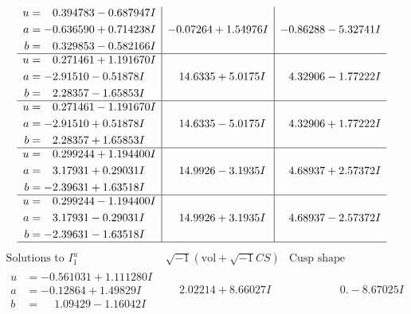 \documentclass[1p]{elsarticle_modified}
\theoremstyle{definition}
\newcommand{\I}{\sqrt{-1}}
\begin{document}
$$\begin{array}{c|c|c}
\begin{aligned}
u &= \phantom{-}0.394783 - 0.687947 I \\
a &= -0.636590 + 0.714238 I \\
b &= \phantom{-}0.329853 - 0.582166 I\end{aligned}
 & -0.07264 + 1.54976 I & -0.86288 - 5.32741 I \\ \hline\begin{aligned}
u &= \phantom{-}0.271461 + 1.191670 I \\
a &= -2.91510 - 0.51878 I \\
b &= \phantom{-}2.28357 - 1.65853 I\end{aligned}
 & \phantom{-}14.6335 + 5.0175 I & \phantom{-}4.32906 - 1.77222 I \\ \hline\begin{aligned}
u &= \phantom{-}0.271461 - 1.191670 I \\
a &= -2.91510 + 0.51878 I \\
b &= \phantom{-}2.28357 + 1.65853 I\end{aligned}
 & \phantom{-}14.6335 - 5.0175 I & \phantom{-}4.32906 + 1.77222 I \\ \hline\begin{aligned}
u &= \phantom{-}0.299244 + 1.194400 I \\
a &= \phantom{-}3.17931 + 0.29031 I \\
b &= -2.39631 + 1.63518 I\end{aligned}
 & \phantom{-}14.9926 - 3.1935 I & \phantom{-}4.68937 + 2.57372 I \\ \hline\begin{aligned}
u &= \phantom{-}0.299244 - 1.194400 I \\
a &= \phantom{-}3.17931 - 0.29031 I \\
b &= -2.39631 - 1.63518 I\end{aligned}
 & \phantom{-}14.9926 + 3.1935 I & \phantom{-}4.68937 - 2.57372 I\\
 \hline 
 \end{array}$$\newpage$$\begin{array}{c|c|c}  
\text{Solutions to }I^u_{1}& \I (\text{vol} + \sqrt{-1}CS) & \text{Cusp shape}\\
 \hline 
\begin{aligned}
u &= -0.561031 + 1.111280 I \\
a &= -0.12864 + 1.49829 I \\
b &= \phantom{-}1.09429 - 1.16042 I\end{aligned}
 & \phantom{-}2.02214 + 8.66027 I & \phantom{-0.000000 } 0. - 8.67025 I \\ \hline\begin{aligned}

\end{aligned}
\end{array}$$
\end{document}
